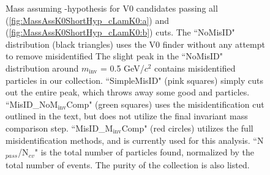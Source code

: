 \documentclass[/home/jesse/Analysis/FemtoAnalysis/AnalysisNotes/AnalysisNoteJBuxton.tex]{subfiles}
\begin{document}
\begin{figure}[h!]
  \centering
  \caption[\Ks contamination in \LamALam collection]{Mass assuming \Ks-hypothesis for V0 candidates passing all \Lam (\ref{fig:MassAssK0ShortHyp_cLamK0:a}) and \ALam (\ref{fig:MassAssK0ShortHyp_cLamK0:b}) cuts.
  The ``NoMisID" distribution (black triangles) uses the V0 finder without any attempt to remove misidentified \Ks
  The slight peak in the ``NoMisID" distribution around $m_{\mathrm{inv}}$ = 0.5 GeV/$c^{2}$ contains misidentified \Ks particles in our \LamALam collection.  
  ``SimpleMisID" (pink squares) simply cuts out the entire peak, which throws away some good \Lam and \ALam particles.
  ``MisID\_NoM$_{\mathrm{inv}}$Comp" (green squares) uses the misidentification cut outlined in the text, but does not utilize the final invariant mass comparison step.
  ``MisID\_M$_{\mathrm{inv}}$Comp" (red circles) utilizes the full misidentification methods, and is currently used for this analysis.  
  ``N$_{pass}$/N$_{ev}$" is the total number of \LamALam particles found, normalized by the total number of events.  The purity of the collection is also listed.}
  \label{fig:MassAssK0ShortHyp_cLamK0}
\end{figure}
\end{document}
